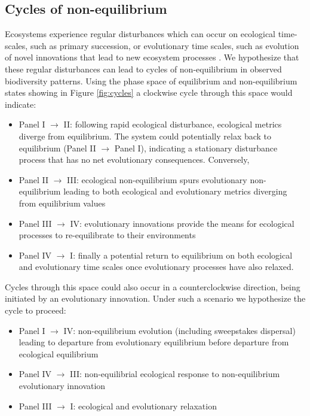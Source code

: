 \documentclass[12pt]{article}
\begin{document}
\subsection{Cycles of non-equilibrium}

Ecosystems experience regular disturbances which can occur on
ecological time-scales, such as primary succession, or evolutionary
time scales, such as evolution of novel innovations that lead to new
ecosystem processes \citep{erwin2008}. We hypothesize that these
regular disturbances can lead to cycles of non-equilibrium in observed
biodiversity patterns. Using the phase space of equilibrium and
non-equilibrium states showing in Figure \ref{fig:cycles} a clockwise
cycle through this space would indicate:

\begin{itemize}
\item Panel I $\rightarrow$ II: following rapid ecological
  disturbance, ecological metrics diverge from equilibrium. The system
  could potentially relax back to equilibrium (Panel II $\rightarrow$
  Panel I), indicating a stationary disturbance process that has no
  net evolutionary consequences. Conversely,
\item Panel II $\rightarrow$ III: ecological non-equilibrium spurs
  evolutionary non-equilibrium leading to both ecological and
  evolutionary metrics diverging from equilibrium values
\item Panel III $\rightarrow$ IV: evolutionary innovations provide the
  means for ecological processes to
  re-equilibrate to their environments
\item Panel IV $\rightarrow$ I: finally a potential return to
  equilibrium on both ecological and evolutionary time scales once
  evolutionary processes have also relaxed.
\end{itemize}

Cycles through this space could also occur in a counterclockwise
direction, being initiated by an evolutionary innovation. Under such a
scenario we hypothesize the cycle to proceed:

\begin{itemize}
\item Panel I $\rightarrow$ IV: non-equilibrium evolution (including
  sweepstakes dispersal) leading to departure from evolutionary
  equilibrium before departure from ecological equilibrium
\item Panel IV $\rightarrow$ III: non-equilibrial ecological response
  to non-equilibrium evolutionary innovation
\item Panel III $\rightarrow$ I: ecological and evolutionary
  relaxation
\end{itemize}
\end{document}
